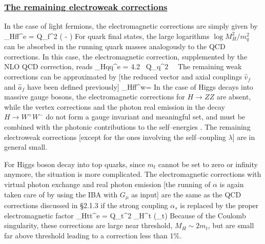 \subsubsection*{\underline{The remaining electroweak corrections}}

In the case of light fermions, the electromagnetic corrections are simply
given by \cite{RChff}
\beq
\delta_{Hff}^e =   \frac{\alpha}{\pi} Q_f^2 \left( -
\log {} \right)
\eeq
For quark final states, the large logarithms $\log M_H^2/m_q^2$ can be absorbed 
in the running quark masses analogously to the QCD corrections. In this case, 
the electromagnetic correction, supplemented by the NLO QCD correction,  
reads \cite{HqqQED-QCD} 
\beq
\delta_{Hqq}^e =  4.2 \, Q_q^2 \,  \, 
\label{HqqQED}
\eeq
The remaining weak corrections can be approximated by [the reduced vector and 
axial couplings $\hat{v}_f$ and $\hat{a}_f$ have been defined previously] 
\cite{RCreviewEW} 
\beq
\delta_{Hff}^w=    
\eeq
In the case of Higgs decays into massive gauge bosons, the electromagnetic
corrections for $H \to ZZ$ are absent, while the vertex corrections and the
photon real emission in the decay  $H \to W^+ W^-$ do not form a gauge
invariant and meaningful set,  and must be combined with the photonic
contributions to the self--energies \cite{RChvv}. The remaining electroweak 
corrections [except for the ones involving the self--coupling $\lambda$] are in 
general small.\s

For Higgs boson decay into top quarks, since $m_t$ cannot be set to zero or
infinity anymore, the situation is more complicated. The electromagnetic
corrections with virtual photon exchange and  real photon emission [the
running of $\alpha$ is again taken care of by using the IBA with $G_\mu$ as
input] are the same as the QCD corrections discussed in \S2.1.3 if the strong
coupling $\alpha_s$ is replaced by the proper electromagnetic factor
\beq
\delta_{Htt}^e =  Q_t^2 \frac{\alpha}{\pi} \Delta_H^t (\beta_t)
\eeq
Because of the Coulomb singularity,  these corrections are large near
threshold, $M_H \sim 2m_t$, but are small  far above threshold leading to 
a correction less than 1\%. \s

